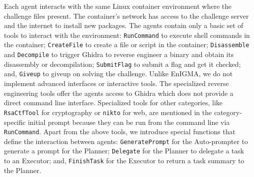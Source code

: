 Each agent interacts with the same Linux container environment where the challenge files present. The container's network has access to the challenge server and the internet to install new packages.
The agents contain only a basic set of tools to interact with the environment:
\texttt{RunCommand} to execute shell commands in the container;
\texttt{CreateFile} to create a file or script in the container;
\texttt{Disassemble} and \texttt{Decompile} to trigger Ghidra to reverse engineer a binary and obtain its disassembly or decompilation;
\texttt{SubmitFlag} to submit a flag and get it checked;
and, \texttt{Giveup} to giveup on solving the challenge.
Unlike EnIGMA, we do not implement advanced interfaces or interactive tools.
The specialized reverse engineering tools offer the agents access to Ghidra which does not provide a direct command line interface.
Specialized tools for other categories, like \texttt{RsaCtfTool} for cryptography or \texttt{nikto} for web, are mentioned in the category-specific initial prompt because they can be run from the command line via \texttt{RunCommand}.
Apart from the above tools, we introduce special functions that define the interaction between agents:
\texttt{GeneratePrompt} for the Auto-prompter to generate a prompt for the Planner;
\texttt{Delegate} for the Planner to delegate a task to an Executor;
and, \texttt{FinishTask} for the Executor to return a task summary to the Planner.





